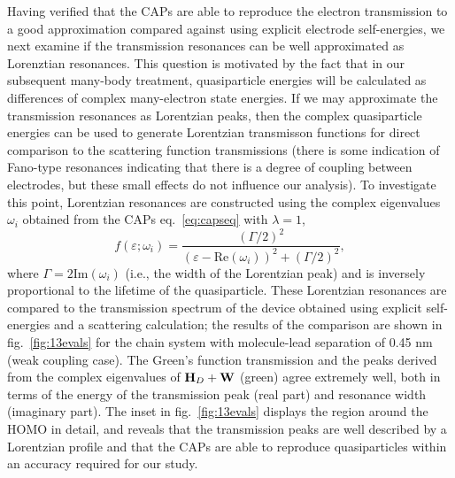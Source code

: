 Having verified that the \acp{CAP} are able to reproduce the electron
transmission to a good approximation compared against using explicit
electrode self-energies, we next examine if the transmission resonances
can be well approximated as Lorenztian resonances. This question is
motivated by the fact that in our subsequent many-body treatment,
quasiparticle energies will be calculated as differences of complex
many-electron state energies. If we may approximate the transmission
resonances as Lorentzian peaks, then the complex quasiparticle energies 
can be used to generate Lorentzian transmisson functions for direct
comparison to the scattering function transmissions (there is some
indication of Fano-type resonances indicating that there is a degree of
coupling between electrodes, but these small effects do not influence
our analysis). To investigate this point, Lorentzian  resonances are
constructed using the complex eigenvalues $\omega_i$ obtained from the 
\acp{CAP} eq.~\ref{eq:capseq} with $\lambda=1$, 
\begin{equation}
        f(\varepsilon;\omega_i)
        = \frac{\left( \Gamma/2 \right)^2}
               {(\varepsilon - \mathrm{Re}(\omega_i))^2
               + \left( \Gamma/2 \right)^2},
        \label{eq:lobro}
\end{equation}
where $\Gamma = 2 \mathrm{Im}(\omega_i)$ (i.e., the width of the
Lorentzian peak) and is inversely proportional to the lifetime of the
quasiparticle. These Lorentzian resonances are compared to the transmission
spectrum of the device obtained using explicit self-energies and a
scattering calculation; the results of the comparison are shown in
fig.~\ref{fig:13evals} for the chain system with molecule-lead separation
of 0.45 nm (weak coupling case). The Green's function transmission and
the peaks derived from the complex eigenvalues of $\mathbf{H}_D + \mathbf{W}$
(green) agree extremely well, both in terms of the energy of the transmission
peak (real part) and resonance width (imaginary part).  The inset in
fig.~\ref{fig:13evals} displays the region around the \ac{HOMO} in
detail, and reveals that the transmission peaks are well described by a
Lorentzian profile and that the CAPs are able to reproduce quasiparticles
within an accuracy required for our study.

